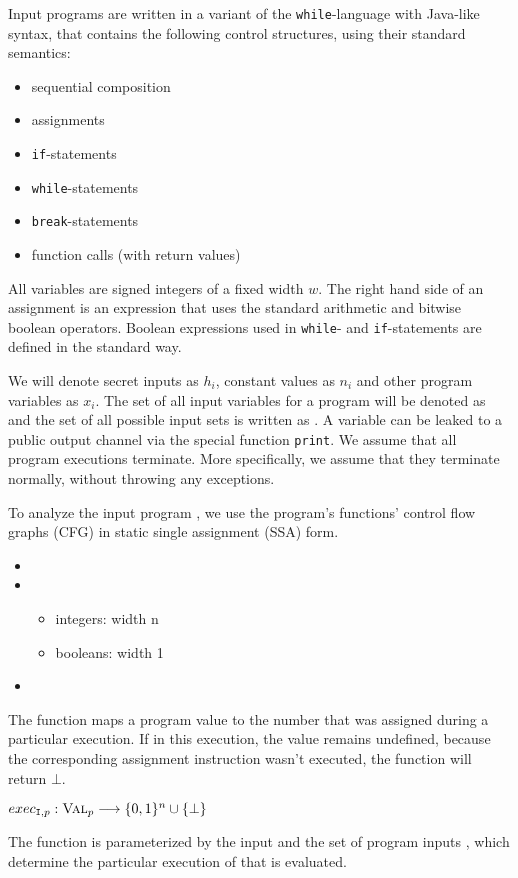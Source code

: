 Input programs are written in a variant of the \texttt{while}-language with Java-like syntax, that contains the following control structures, using their standard semantics:
\begin{itemize}
    \setlength\itemsep{0em}
    \item sequential composition
    \item assignments
    \item \texttt{if}-statements
    \item \texttt{while}-statements
    \item \texttt{break}-statements
    \item function calls (with return values)
\end{itemize}
All variables are signed integers of a fixed width $w$. The right hand side of an assignment is an expression that uses the standard arithmetic and bitwise boolean operators. Boolean expressions used in \texttt{while}- and \texttt{if}-statements are defined in the standard way.

We will denote secret inputs as $h_i$, constant values as $n_i$ and other program variables as $x_i$. The set of all input variables for a program will be denoted as \In and the set of all possible input sets is written as \allIn. A variable can be leaked to a public output channel via the special function \texttt{print}. We assume that all program executions terminate. More specifically, we assume that they terminate normally, without throwing any exceptions.

To analyze the input program \p, we use the program's functions' control flow graphs (CFG) in static single assignment (SSA) form.

\begin{itemize}
    \item {}
    \item {}
    \begin{itemize}
        \item integers: width n
        \item booleans: width 1
    \end{itemize}
    \item {}
\end{itemize}

\begin{definition}
The function maps a program value to the number that was assigned during a particular execution. If in this execution, the value remains undefined, because the corresponding assignment instruction wasn't executed, the function will return $\bot$.
    \begin{center}
        $exec_{\mathtt{I}, p}: \textsc{Val}_p \longrightarrow \{0, 1\}^n \cup \{\bot\}$
    \end{center}
The function is parameterized by the input \p and the set of program inputs \I, which determine the particular execution of \p that is evaluated.
\end{definition}

